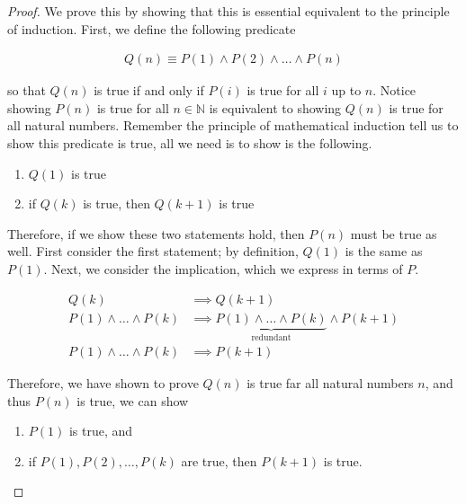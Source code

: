 \documentclass[twoside]{report}
\begin{document}
\begin{proof}
	We prove this by showing that this is essential equivalent to the principle of induction. First, we define the following predicate
	
	\begin{align*}
		Q(n) \equiv P(1) \land P(2) \land \dots \land P(n)
	\end{align*}
	
	so that $Q(n)$ is true if and only if $P(i)$ is true for all $i$ up to $n$. Notice showing $P(n)$ is true for all $n \in \mathbb{N}$ is equivalent to showing $Q(n)$ is true for all natural numbers. Remember the principle of mathematical induction tell us to show this predicate is true, all we need is to show is the following.

	\vspace{\baselineskip}
	\begin{enumerate}
		\item $Q(1)$ is true
		\item if $Q(k)$ is true, then $Q(k + 1)$ is true
	\end{enumerate}
	\vspace{\baselineskip}

	Therefore, if we show these two statements hold, then $P(n)$ must be true as well. First consider the first statement; by definition, $Q(1)$ is the same as $P(1)$. Next, we consider the implication, which we express in terms of $P$.
	
	\begin{align*}
		Q(k) &\implies Q(k + 1) \\
		P(1) \land \dots \land P(k) &\implies \underbrace{P(1) \land \dots \land P(k)}_\text{redundant} \land P(k + 1) \\
		P(1) \land \dots \land P(k) &\implies P(k + 1)
	\end{align*}
	
	Therefore, we have shown to prove $Q(n)$ is true far all natural numbers $n$, and thus $P(n)$ is true, we can show
	
	\vspace{\baselineskip}
	\begin{enumerate}
		\item $P(1)$ is true, and
		\item if $P(1), P(2), \dots, P(k)$ are true, then $P(k + 1)$ is true.
	\end{enumerate}
\end{proof}
\vspace{\baselineskip}
\end{document}
